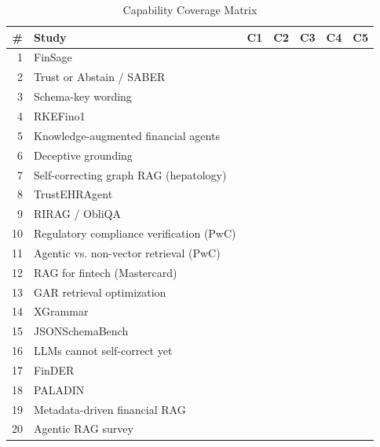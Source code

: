 \documentclass[10pt,twocolumn,letterpaper]{article}
\newcommand{\FU}{\CIRCLE}
\newcommand{\PA}{\LEFTcircle}
\newcommand{\NO}{\Circle}
\begin{document}
\begin{table}[!t]
\caption{Capability Coverage Matrix}
\label{tab:coverage}
\centering
\scriptsize
\setlength{\tabcolsep}{4pt}
\renewcommand{\arraystretch}{1.0}
\begin{tabular}{@{}rp{3.55cm}ccccc@{}}
\hline
\# & Study & C1 & C2 & C3 & C4 & C5 \\
\hline
1 & FinSage \cite{finsage} & \NO & \NO & \PA & \NO & \FU \\
2 & Trust or Abstain / SABER \cite{saber} & \NO & \PA & \FU & \PA & \NO \\
3 & Schema-key wording \cite{schemakey} & \FU & \NO & \NO & \NO & \NO \\
4 & RKEFino1 \cite{rkefino1} & \PA & \NO & \NO & \NO & \FU \\
5 & Knowledge-augmented financial agents \cite{knowagent} & \NO & \PA & \PA & \NO & \FU \\
6 & Deceptive grounding \cite{deceptive} & \NO & \FU & \NO & \NO & \NO \\
7 & Self-correcting graph RAG (hepatology) \cite{graphrag} & \NO & \PA & \FU & \PA & \NO \\
8 & TrustEHRAgent \cite{trustehr} & \NO & \PA & \PA & \NO & \NO \\
9 & RIRAG / ObliQA \cite{rirag} & \NO & \PA & \NO & \NO & \FU \\
10 & Regulatory compliance verification (PwC) \cite{pwcverif} & \PA & \NO & \NO & \NO & \FU \\
11 & Agentic vs. non-vector retrieval (PwC) \cite{pwcretr} & \NO & \NO & \PA & \NO & \FU \\
12 & RAG for fintech (Mastercard) \cite{fintech} & \NO & \PA & \PA & \PA & \FU \\
13 & GAR retrieval optimization \cite{gar} & \NO & \NO & \PA & \NO & \FU \\
14 & XGrammar \cite{xgrammar} & \FU & \NO & \NO & \NO & \NO \\
15 & JSONSchemaBench \cite{jsonbench} & \FU & \NO & \NO & \NO & \NO \\
16 & LLMs cannot self-correct yet \cite{cannotselfcorrect} & \NO & \NO & \NO & \PA & \NO \\
17 & FinDER \cite{finder} & \NO & \PA & \NO & \NO & \FU \\
18 & PALADIN \cite{paladin} & \PA & \NO & \PA & \FU & \NO \\
19 & Metadata-driven financial RAG \cite{metadata} & \NO & \NO & \PA & \NO & \FU \\
20 & Agentic RAG survey \cite{agenticsurvey} & \PA & \NO & \FU & \PA & \NO \\

\end{tabular}
\end{table}
\end{document}
